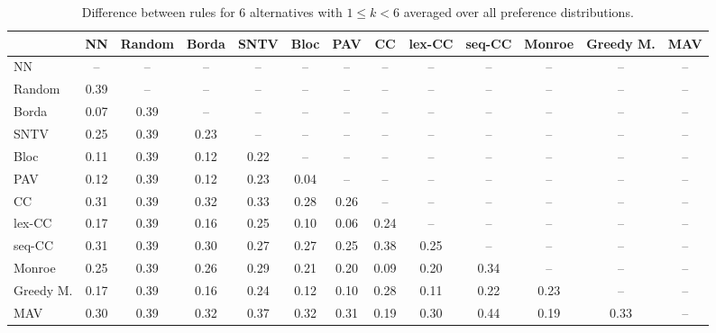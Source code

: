 
\begin{table*}[h!]
\centering
\begin{tabular}{lcccccccccccc}
\toprule
 & NN & Random & Borda & SNTV & Bloc & PAV & CC & lex-CC & seq-CC & Monroe & Greedy M. & MAV \\
\midrule
NN & -- & -- & -- & -- & -- & -- & -- & -- & -- & -- & -- & -- \\
Random & 0.39 & -- & -- & -- & -- & -- & -- & -- & -- & -- & -- & -- \\
Borda & 0.07 & 0.39 & -- & -- & -- & -- & -- & -- & -- & -- & -- & -- \\
SNTV & 0.25 & 0.39 & 0.23 & -- & -- & -- & -- & -- & -- & -- & -- & -- \\
Bloc & 0.11 & 0.39 & 0.12 & 0.22 & -- & -- & -- & -- & -- & -- & -- & -- \\
PAV & 0.12 & 0.39 & 0.12 & 0.23 & 0.04 & -- & -- & -- & -- & -- & -- & -- \\
CC & 0.31 & 0.39 & 0.32 & 0.33 & 0.28 & 0.26 & -- & -- & -- & -- & -- & -- \\
lex-CC & 0.17 & 0.39 & 0.16 & 0.25 & 0.10 & 0.06 & 0.24 & -- & -- & -- & -- & -- \\
seq-CC & 0.31 & 0.39 & 0.30 & 0.27 & 0.27 & 0.25 & 0.38 & 0.25 & -- & -- & -- & -- \\
Monroe & 0.25 & 0.39 & 0.26 & 0.29 & 0.21 & 0.20 & 0.09 & 0.20 & 0.34 & -- & -- & -- \\
Greedy M. & 0.17 & 0.39 & 0.16 & 0.24 & 0.12 & 0.10 & 0.28 & 0.11 & 0.22 & 0.23 & -- & -- \\
MAV & 0.30 & 0.39 & 0.32 & 0.37 & 0.32 & 0.31 & 0.19 & 0.30 & 0.44 & 0.19 & 0.33 & -- \\
\bottomrule
\end{tabular}

\caption{Difference between rules for 6 alternatives with $1 \leq k < 6$ averaged over all preference distributions.}
\end{table*}
